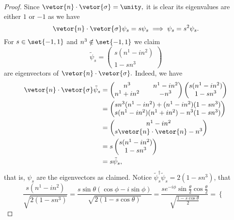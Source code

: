 \begin{proof}
   Since \(\vetor{n} \cdot \vetor{\sigma} = \unity,\) it is clear its eigenvalues are either \(1\) or \(-1\) as we have
   \begin{equation*}
      \vetor{n} \cdot \vetor{\sigma} \psi_s = s \psi_s \implies \psi_s = s^2 \psi_s.
   \end{equation*}
   For \(s \in \set{-1,1}\) and \(n^3 \notin \set{-1,1}\) we claim
   \begin{equation*}
      \tilde{\psi}_s = \begin{pmatrix}
          s( n^1 - i n^2)\\
          1 - s n^3
      \end{pmatrix}
   \end{equation*}
   are eigenvectors of \(\vetor{n} \cdot \vetor{\sigma}.\) Indeed, we have
   \begin{align*}
      \vetor{n} \cdot \vetor{\sigma} \tilde{\psi}_s &= \begin{pmatrix}
         n^3 && n^1 - i n^2\\
         n^1 + i n^2 && -n^3
      \end{pmatrix}
      \begin{pmatrix}
          s( n^1 - i n^2)\\
          1 - s n^3
      \end{pmatrix}\\
      &= 
      \begin{pmatrix}
         sn^3 (n^1 - in^2) + (n^1 - i n^2) (1 - sn^3)\\
         s(n^1 - in^2)(n^1 + in^2) - n^3(1 - sn^3)
      \end{pmatrix}\\
      &= \begin{pmatrix}
          n^1 - in^2\\
          s\vetor{n}\cdot\vetor{n} - n^3
      \end{pmatrix}\\
      &= s \begin{pmatrix}
          s(n^1 - in^2)\\
          1 - sn^3
      \end{pmatrix}\\
      &= s \tilde{\psi}_s,
   \end{align*}
   that is, \(\psi_s\) are the eigenvectors as claimed. Notice \(\tilde{\psi}^\dag_s \tilde{\psi}_s = 2(1 - sn^3)\), that
   \begin{equation*}
      \frac{s (n^1 - i n^2)}{\sqrt{2(1 - sn^3)}} = \frac{s \sin\theta (\cos\phi - i \sin\phi)}{\sqrt{2(1 - s\cos\theta)}} = \frac{s e^{-i\phi} \sin\frac\theta2 \cos\frac\theta2}{\sqrt{\frac{1 - s \cos\theta}2}} = \begin{cases}

\end{cases}
\end{equation*}
\end{proof}
